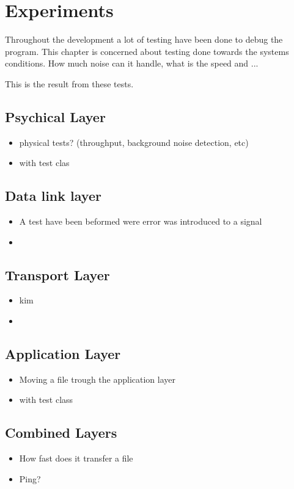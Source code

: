 \chapter{Experiments}\label{chap:experiments}
Throughout the development a lot of testing have been done to debug the program. This chapter is concerned about testing done towards the systems conditions. How much noise can it handle, what is the speed and ... 

This is the result from these tests.


\section{Psychical Layer}

\begin{itemize}
\item physical tests? (throughput, background noise detection, etc)
\item with test clas
\end{itemize}

\section{Data link layer}

\begin{itemize}
\item A test have been beformed were error was introduced to a signal
\item 
\end{itemize}

\section{Transport Layer}

\begin{itemize}
\item kim
\item 
\end{itemize}

\section{Application Layer}

\begin{itemize}
\item Moving a file trough the application layer
\item with test class
\end{itemize}

\section{Combined Layers}

\begin{itemize}
\item How fast does it transfer a file
\item Ping?
\end{itemize}
